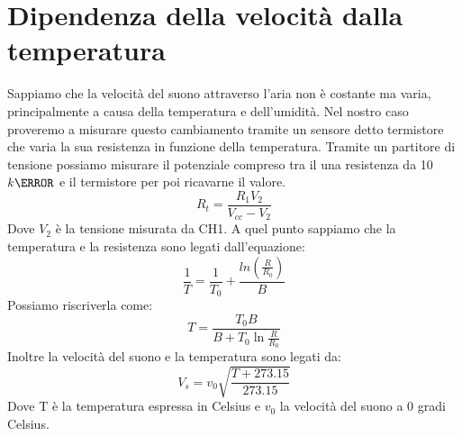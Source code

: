 \documentclass[10pt, a4paper, italian]{article}
\begin{document}
\section{Dipendenza della velocità dalla temperatura}
Sappiamo che la velocità del suono attraverso l'aria non è costante ma varia, principalmente a causa della temperatura e dell'umidità.
Nel nostro caso proveremo a misurare questo cambiamento tramite un sensore detto termistore che varia la sua resistenza in funzione della temperatura.
Tramite un partitore di tensione possiamo misurare il potenziale compreso tra il una resistenza da 10 $k\ohm$ e il termistore per poi ricavarne il valore.
\begin{equation}
R_t=\frac{R_1V_2}{V_{cc}-V_2}
\end{equation}
Dove $V_2$ è la tensione misurata da CH1.
A quel punto sappiamo che la temperatura e la resistenza sono legati dall'equazione:
\begin{equation}
\frac{1}{T}= \frac{1}{T_0} + \frac{ln(\frac{R}{R_0})}{B}
\end{equation}
Possiamo riscriverla come:
\begin{equation}
T=\frac{T_0 B}{B+T_0 \ln{\frac{R}{R_0}}}
\end{equation}
Inoltre la velocità del suono e la temperatura sono legati da:
\begin{equation}
V_s=v_0\sqrt{\frac{T+273.15}{273.15}}
\end{equation}
Dove T è la temperatura espressa in Celsius e $v_0$ la velocità del suono a 0 gradi Celsius.
\end{document}
